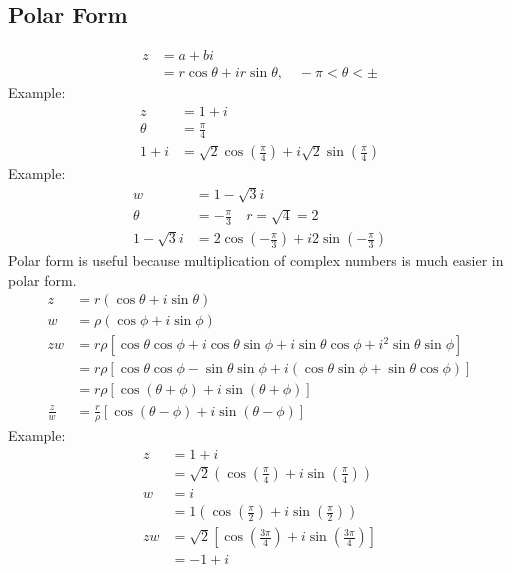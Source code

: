 \documentclass{math}
\begin{document}
\subsection*{Polar Form}
\begin{center}
\end{center}
\begin{align*}
  z &= a+bi \\
  &= r\cos\theta+ir\sin\theta, \quad -\pi<\theta<\pm
\end{align*}
Example:
\begin{align*}
  z &= 1+i \\
  \theta &= \frac{\pi}{4} \\
  1+i &= \sqrt{2}\cos(\frac{\pi}{4})+i\sqrt{2}\sin(\frac{\pi}{4})
\end{align*}
Example:
\begin{align*}
  w &= 1-\sqrt{3}i \\
  \theta &= -\frac{\pi}{3} \quad r = \sqrt{4} = 2 \\
  1-\sqrt{3}i &= 2\cos(-\frac{\pi}{3})+i2\sin(-\frac{\pi}{3})
\end{align*}
Polar form is useful because multiplication of complex numbers is much easier in
polar form.
\begin{align*}
  z &= r(\cos\theta+i\sin\theta) \\
  w &= \rho(\cos\phi+i\sin\phi) \\
  zw &= r\rho\left[\cos\theta\cos\phi+i\cos\theta\sin\phi+i\sin\theta\cos\phi+
    i^2\sin\theta\sin\phi\right] \\
  &= r\rho\left[\cos\theta\cos\phi-\sin\theta\sin\phi+
    i(\cos\theta\sin\phi+\sin\theta\cos\phi)\right] \\
  &= r\rho\left[\cos(\theta+\phi)+i\sin(\theta+\phi)\right] \\
  \frac{z}{w} &= \frac{r}{\rho}\left[\cos(\theta-\phi)+i\sin(\theta-\phi)\right]
\end{align*}
Example:
\begin{align*}
  z &= 1+i \\
  &= \sqrt{2}\left(\cos(\frac{\pi}{4})+i\sin(\frac{\pi}{4})\right) \\
  w &= i \\
  &= 1\left(\cos(\frac{\pi}{2})+i\sin(\frac{\pi}{2})\right) \\
  zw &= \sqrt{2}\left[\cos(\frac{3\pi}{4})+i\sin(\frac{3\pi}{4})\right] \\
  &= -1+i
\end{align*}
\end{document}
